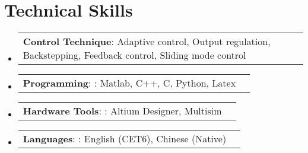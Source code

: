 \documentclass[letterpaper,11pt]{article}
\makeatletter
\newcommand{\resumeProjectHeading}[2]{
    \item
    \begin{tabular*}{0.97\textwidth}{l@{\extracolsep{\fill}}r}
      \small#1 & #2 \\
    \end{tabular*}\vspace{-7pt}
}
\newcommand{\resumeSubHeadingListStart}{\begin{itemize}[leftmargin=0.15in, label={}]}
\newcommand{\resumeSubHeadingListEnd}{\end{itemize}}
\makeatother
\begin{document}
%
\section{Technical Skills}
 
 \resumeSubHeadingListStart
    \resumeProjectHeading
     {\textbf{Control Technique}: Adaptive control, Output regulation, Backstepping, Feedback control, Sliding mode control}{}
     
     \resumeProjectHeading
     {\textbf{Programming}: : Matlab, C++, C, Python, Latex}{}
     
     \resumeProjectHeading
     {\textbf{Hardware Tools}: : Altium Designer, Multisim}{}
         
     \resumeProjectHeading
     {\textbf{Languages}: : English (CET6), Chinese (Native)}{}

 \resumeSubHeadingListEnd


\end{document}
